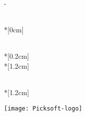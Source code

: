 \thispagestyle{empty}             %
\calccentering{\unitlength}
\begin{adjustwidth*}{\unitlength}{-\unitlength}
    \begin{adjustwidth}{-0.5cm}{-0.5cm}
        \sffamily
        \begin{flushright}
            \thesistypeabbr{} \\*[0cm]
            \thesistype{}\\
        \end{flushright}
        \vspace*{\fill}
        \noindent
        \HUGE \thesistitle{}\\*[0.2cm]
        \Huge \thesissubtitle{}\\*[1.2cm]
        \parbox[b]{0.5\linewidth}{%
            \LARGE 
            \thesisauthor{}\\*[1.2cm]
            \Large
            \thesislocation{} \the\year
        }
        \hfill\texttt{[image: Picksoft-logo]}
    \end{adjustwidth}
\end{adjustwidth*}
\normalfont
\normalsize
